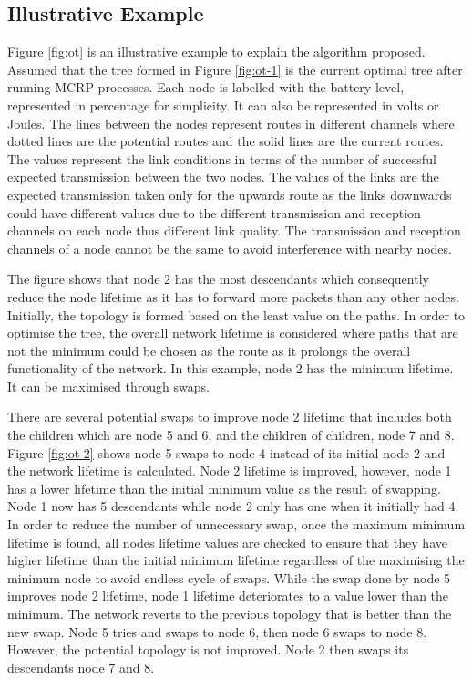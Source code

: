 \subsection{Illustrative Example}

Figure \ref{fig:ot} is an illustrative example to explain the algorithm proposed. Assumed that the tree formed in Figure \ref{fig:ot-1} is the current optimal tree after running MCRP processes. Each node is labelled with the battery level, represented in percentage for simplicity. It can also be represented in volts or Joules. The lines between the nodes represent routes in different channels where dotted lines are the potential routes and the solid lines are the current routes. The values represent the link conditions in terms of the number of successful expected transmission between the two nodes. The values of the links are the expected transmission taken only for the upwards route as the links downwards could have different values due to the different transmission and reception channels on each node thus different link quality. 
The transmission and reception channels of a node cannot be the same to avoid interference with nearby nodes.

The figure shows that node 2 has the most descendants which consequently reduce the node lifetime as it has to forward more packets than any other nodes. Initially, the topology is formed based on the least value on the paths. In order to optimise the tree, the overall network lifetime is considered where paths that are not the minimum could be chosen as the route as it prolongs the overall functionality of the network. In this example, node 2 has the minimum lifetime. It can be maximised through swaps. 

There are several potential swaps to improve node 2 lifetime that includes both the children which are node 5 and 6, and the children of children, node 7 and 8. Figure \ref{fig:ot-2} shows node 5 swaps to node 4 instead of its initial node 2 and the network lifetime is calculated. Node 2 lifetime is improved, however, node 1 has a lower lifetime than the initial minimum value as the result of swapping. Node 1 now has 5 descendants while node 2 only has one when it initially had 4. In order to reduce the number of unnecessary swap, once the maximum minimum lifetime is found, all nodes lifetime values are checked to ensure that they have higher lifetime than the initial minimum lifetime regardless of the maximising the minimum node to avoid endless cycle of swaps. While the swap done by node 5 improves node 2 lifetime, node 1 lifetime deteriorates to a value lower than the minimum. The network reverts to the previous topology that is better than the new swap. Node 5 tries and swaps to node 6, then node 6 swaps to node 8. However, the potential topology is not improved. Node 2 then swaps its descendants node 7 and 8.

